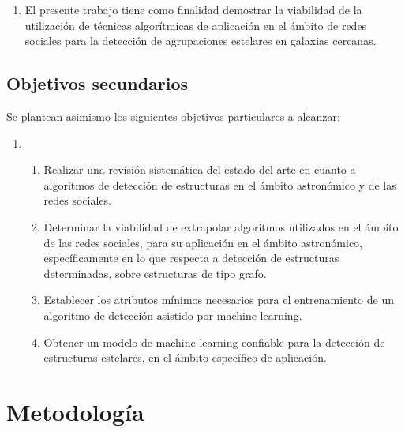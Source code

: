 \documentclass[
	11pt,oneside,a4paper,
	headsepline,footsepline,
	fleqn,
]{memoir}
\begin{document}
\begin{enumerate}
	\item \label{objetivo:general} El presente trabajo tiene como finalidad demostrar la viabilidad de la utilización de técnicas algorítmicas de aplicación en el ámbito de redes sociales para la detección de agrupaciones estelares en galaxias cercanas.	
\end{enumerate}


\subsection{Objetivos secundarios}

Se plantean asimismo los siguientes objetivos particulares a alcanzar:

\begin{enumerate}\addtocounter{enumi}{1}
	\item[]
	\begin{enumerate}[label*=\arabic{*}]
		\item \label{objetivo:particular1} Realizar una revisión sistemática del estado del arte en cuanto a algoritmos de detección de estructuras en el ámbito astronómico y de las redes sociales.
		
		\item \label{objetivo:particular2} Determinar la viabilidad de extrapolar algoritmos utilizados en el ámbito de las redes sociales, para su aplicación en el ámbito astronómico, específicamente en lo que respecta a detección de estructuras determinadas, sobre estructuras de tipo grafo.
		
		\item \label{objetivo:particular3} Establecer los atributos mínimos necesarios para el entrenamiento de un algoritmo de detección asistido por machine learning.
		
		\item \label{objetivo:particular4} Obtener un modelo de machine learning confiable para la detección de estructuras estelares, en el ámbito específico de aplicación.
	\end{enumerate}
\end{enumerate}

\section {Metodología}
\end{document}
